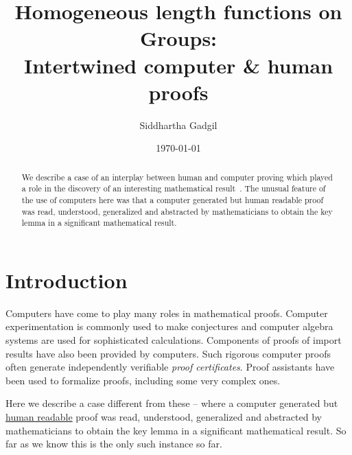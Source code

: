 \documentclass{amsart}
\theoremstyle{plain}
\theoremstyle{definition}
\theoremstyle{remark}
\begin{document}
\title[Intertwined computer \& human proofs]{Homogeneous length functions on Groups: \\ Intertwined computer \& human proofs}

\author{Siddhartha Gadgil}

\address{	Department of Mathematics,\\
		Indian Institute of Science,\\
		Bangalore 560012, India}



\date{\today}

\begin{abstract}
We describe  a case of an interplay between human and computer proving which played a role in the discovery of an interesting mathematical result~\cite{polymath}. The unusual feature of the use of computers here was that a computer generated but human readable proof was read, understood, generalized and abstracted by mathematicians to obtain the key lemma in a significant mathematical result.
\end{abstract}

\maketitle

\section{Introduction}

Computers have come to play many roles in mathematical proofs. Computer experimentation is commonly used to make conjectures and computer algebra systems are used for sophisticated calculations. Components of proofs of import results have also been provided by computers. Such rigorous computer proofs often generate independently verifiable \emph{proof certificates}. Proof assistants have been used to formalize proofs, including some very complex ones.

Here we describe a case different from these -- where a computer generated but \href{https://github.com/siddhartha-gadgil/Superficial/wiki/A-commutator-bound}{human readable} proof  was read, understood, generalized and abstracted by mathematicians to obtain the key lemma in a significant mathematical result. So far as we know this is the only such instance so far.
\end{document}
